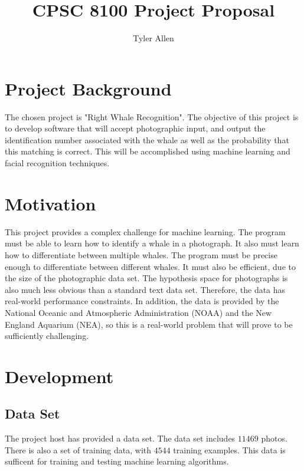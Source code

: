 \documentclass[11pt]{article}
\newcommand{\?}{\stackrel{?}{=}}
\begin{document}
\title{CPSC 8100 Project Proposal}
\date{}
\author{Tyler Allen}
\maketitle

\doublespacing

\section{Project Background}
The chosen project is "Right Whale Recognition"\cite{kaggle_desc}. The objective of
this project is to develop software that will accept photographic input, and 
output the identification number associated with the whale as well as the probability
that this matching is correct. This will be accomplished using machine learning 
and facial recognition techniques. 

\section{Motivation}
This project provides a complex challenge for machine learning. The program
must be able to learn how to identify a whale in a photograph. It also must learn
how to differentiate between multiple whales. The program must be precise enough
to differentiate between different whales. It must also be efficient, due to the
size of the photographic data set. The hypothesis space for photographs is also
much less obvious than a standard text data set. Therefore, the data has real-world performance
constraints. In addition, the data is provided by the National Oceanic and 
Atmospheric Administration (NOAA) and the New England Aquarium (NEA), so this is a real-world problem that will 
prove to be sufficiently challenging\cite{kaggle_desc}\cite{NOAA}\cite{NEA}.
 
 \newpage
\section{Development}

\subsection{Data Set}
The project host has provided a data set\cite{kaggle_data}. The data set includes 
$11469$ photos. There is also a set of training data, with $4544$ training examples.
This data is sufficent for training and testing machine learning algorithms. 
\end{document}
